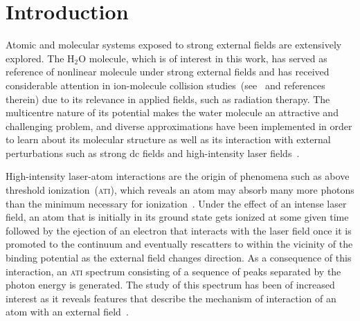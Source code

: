 \chapter{Introduction}
\label{cha:introduction}


Atomic and molecular systems exposed to strong external fields are
extensively explored. The H$_{2}$O molecule, which is of interest in
this work, has served as reference of nonlinear molecule under strong
external fields and has received considerable attention in
ion-molecule collision
studies~(see~\cite{horbatsch_2012col,illescas_2013} and references
therein) due to its relevance in applied fields, such as radiation
therapy.  The multicentre nature of its potential makes the water
molecule an attractive and challenging problem, and diverse
approximations have been implemented in order to learn about its
molecular structure as well as its interaction with external
perturbations such as strong dc fields and high-intensity laser
fields~\cite{Jagau_manybody_H2O,Toru_weakF_H2O,Krause2015_CAP_H2O,Zhao_2011_H2Otunneling,Petretti_H2O_laser}.

High-intensity laser-atom interactions are the origin of phenomena
such as above threshold ionization~(\textsc{ati}), which reveals an
atom may absorb many more photons than the minimum necessary for
ionization~\cite{ATI1979}.
Under the effect of an intense laser field, an atom that is initially
in its ground state gets ionized at some given time followed by the
ejection of an electron that interacts with the laser field once it is
promoted to the continuum and eventually rescatters to within the
vicinity of the binding potential as the external field changes
direction. As a consequence of this interaction, an \textsc{ati}
spectrum consisting of a sequence of peaks separated by the photon
energy is generated. The study of this spectrum has been of increased
interest as it reveals features that describe the mechanism of
interaction of an atom with an external
field~\cite{BeckerRescattering_2018,Becker_ati2002}.

